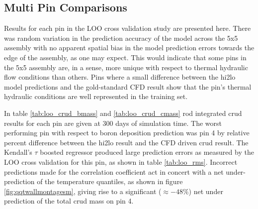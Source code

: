 
\subsection{Multi Pin Comparisons}
\label{sec:multi_pin_result}

Results for each pin in the LOO cross validation study are presented here.  There was random variation in the prediction accuracy of the model across the 5x5 assembly with no apparent spatial bias in the model prediction errors towards the edge of the assembly, as one may expect.  This would indicate that some pins in the 5x5 assembly are, in a sense, more unique with respect to thermal hydraulic flow conditions than others.  Pins where a small difference between the hi2lo model predictions and the gold-standard CFD result show that the pin's thermal hydraulic conditions are well represented in the training set.

In table \ref{tab:loo_crud_bmass} and \ref{tab:loo_crud_cmass} rod integrated crud results for each pin are given at 300 days of simulation time.  The worst performing pin with respect to boron deposition prediction was pin 4 by relative percent difference between the hi2lo result and the CFD driven crud result.  The Kendall's $\tau$ boosted regressor produced large prediction errors as measured by the LOO cross validation for this pin, as shown in table \ref{tab:loo_rms}.  Incorrect predictions made for the correlation coefficient act in concert with a net under-prediction of the temperature quantiles, as shown in figure \ref{fig:qqtwallmontagesm}, giving rise to a significant ($\approx -48\%$) net under prediction of the total crud mass on pin 4.



